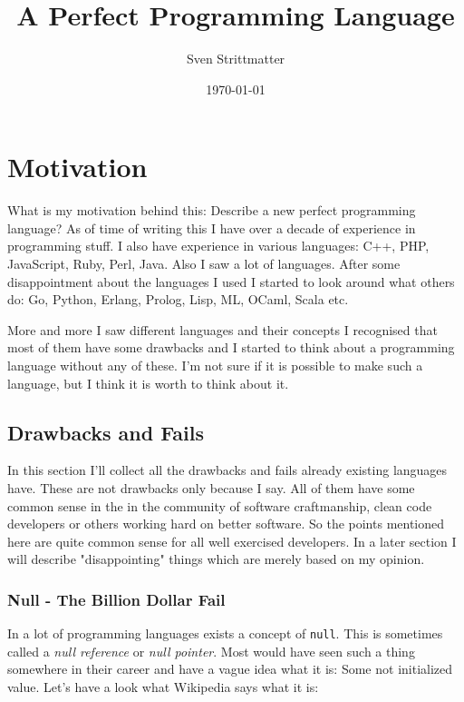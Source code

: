 \documentclass[a4paper,12pt]{article}
\title{A Perfect Programming Language}
\author{Sven Strittmatter}
\date{\today}
\begin{document}
\maketitle
{}
\newpage

\tableofcontents

\newpage

\section{Motivation}

What is my motivation behind this: Describe a new perfect programming language? As of time of writing this I have over a decade of experience in programming stuff. I also have experience in various languages: C++, PHP, JavaScript, Ruby, Perl, Java. Also I saw a lot of languages. After some disappointment about the languages I used I started to look around what others do: Go, Python, Erlang, Prolog, Lisp, ML, OCaml, Scala etc.

More and more I saw different languages and their concepts I recognised that most of them have some drawbacks and I started to think about a programming language without any of these. I'm not sure if it is possible to make such a language, but I think it is worth to think about it.

\subsection{Drawbacks and Fails}

In this section I'll collect all the drawbacks and fails already existing languages have. These are not drawbacks only because I say. All of them have some common sense in the in the community of software craftmanship, clean code developers or others working hard on better software. So the points mentioned here are quite common sense for all well exercised developers. In a later section I will describe "disappointing" things which are merely based on my opinion.

\subsubsection{Null - The Billion Dollar Fail}

In a lot of programming languages exists a concept of \verb|null|. This is sometimes called a \textit{null reference} or \textit{null pointer}. Most would have seen such a thing somewhere in their career and have a vague idea what it is: Some not initialized value. Let's have a look what Wikipedia\cite{null-wiki} says what it is:
\end{document}
